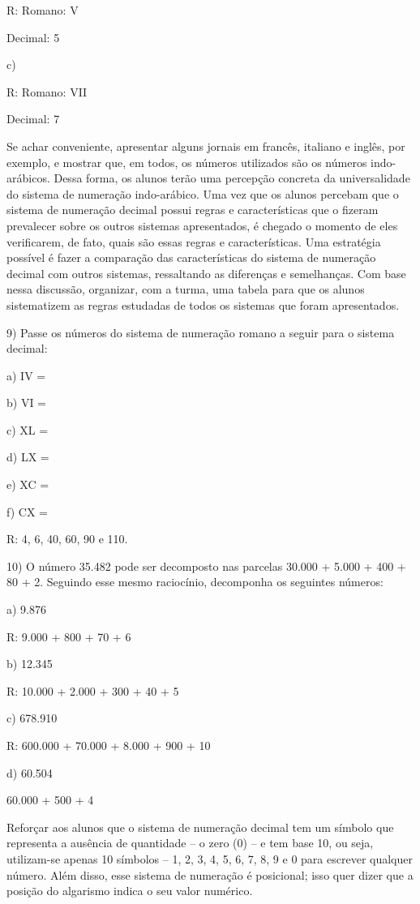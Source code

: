 R: Romano: V

Decimal: 5

c)


R: Romano: VII

Decimal: 7

Se achar conveniente, apresentar alguns jornais em francês, italiano e
inglês, por exemplo, e mostrar que, em todos, os números utilizados são
os números indo-arábicos. Dessa forma, os alunos terão uma percepção
concreta da universalidade do sistema de numeração indo-arábico. Uma vez
que os alunos percebam que o sistema de numeração decimal possui regras
e características que o fizeram prevalecer sobre os outros sistemas
apresentados, é chegado o momento de eles verificarem, de fato, quais
são essas regras e características. Uma estratégia possível é fazer a
comparação das características do sistema de numeração decimal com
outros sistemas, ressaltando as diferenças e semelhanças. Com base nessa
discussão, organizar, com a turma, uma tabela para que os alunos
sistematizem as regras estudadas de todos os sistemas que foram
apresentados.

9) Passe os números do sistema de numeração romano a seguir para o
sistema decimal:

a) IV =

b) VI =

c) XL =

d) LX =

e) XC =

f) CX =

R: 4, 6, 40, 60, 90 e 110.

10) O número 35.482 pode ser decomposto nas parcelas 30.000 + 5.000 +
400 + 80 + 2. Seguindo esse mesmo raciocínio, decomponha os seguintes
números:

a) 9.876

R: 9.000 + 800 + 70 + 6

b) 12.345

R: 10.000 + 2.000 + 300 + 40 + 5

c) 678.910

R: 600.000 + 70.000 + 8.000 + 900 + 10

d) 60.504

60.000 + 500 + 4

Reforçar aos alunos que o sistema de numeração decimal tem um símbolo
que representa a ausência de quantidade -- o zero (0) -- e tem base 10,
ou seja, utilizam-se apenas 10 símbolos -- 1, 2, 3, 4, 5, 6, 7, 8, 9 e 0
para escrever qualquer número. Além disso, esse sistema de numeração é
posicional; isso quer dizer que a posição do algarismo indica o seu
valor numérico.

